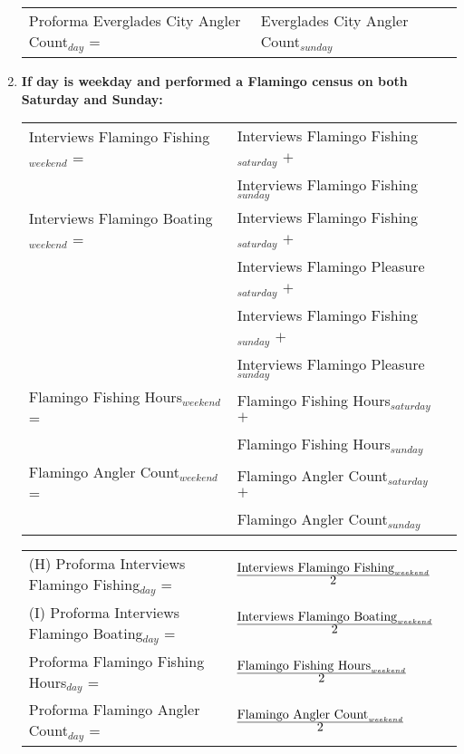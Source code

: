 \documentclass[letterpaper,12pt]{article}
\newcommand{\fraction}[1]{\textrm{\normalsize{#1}}}
\begin{document}
\begin{enumerate}
\begin{tabular}{l@{ }l@{ }l}
	Proforma Everglades City Angler Count$_{day}$ =
		& Everglades City Angler Count$_{sunday}$ \\
\end{tabular}

\item
\textbf{If day is weekday and performed a Flamingo census on both Saturday and Sunday:} \\
\begin{tabular}{l@{ }l@{ }l}
	Interviews Flamingo Fishing$_{weekend}$ =
		& Interviews Flamingo Fishing$_{saturday}$ $+$ \\
		& Interviews Flamingo Fishing$_{sunday}$ \\

	Interviews Flamingo Boating$_{weekend}$ =
		& Interviews Flamingo Fishing$_{saturday}$ $+$ \\
		& Interviews Flamingo Pleasure$_{saturday}$ $+$ \\
		& Interviews Flamingo Fishing$_{sunday}$ $+$ \\
		& Interviews Flamingo Pleasure$_{sunday}$ \\

	Flamingo Fishing Hours$_{weekend}$ =
		& Flamingo Fishing Hours$_{saturday}$ $+$ \\
		& Flamingo Fishing Hours$_{sunday}$ \\

	Flamingo Angler Count$_{weekend}$ =
		& Flamingo Angler Count$_{saturday}$ $+$ \\
		& Flamingo Angler Count$_{sunday}$ \\
\end{tabular}

\begin{tabular}{l@{ }l@{ }l}
	(H) Proforma Interviews Flamingo Fishing$_{day}$ =
		& $
\frac
	{\fraction{Interviews Flamingo Fishing}_{weekend}}
      	{\fraction{2}}
		$ \\

	(I) Proforma Interviews Flamingo Boating$_{day}$ =
		& $
\frac
	{\fraction{Interviews Flamingo Boating}_{weekend}}
      	{\fraction{2}}
		$ \\

	Proforma Flamingo Fishing Hours$_{day}$ =
		& $
\frac
	{\fraction{Flamingo Fishing Hours}_{weekend}}
	{\fraction{2}}
		$ \\

	Proforma Flamingo Angler Count$_{day}$ =
		& $
\frac
	{\fraction{Flamingo Angler Count}_{weekend}}
	{\fraction{2}}
		$ \\
\end{tabular}


\end{enumerate}
\end{document}
